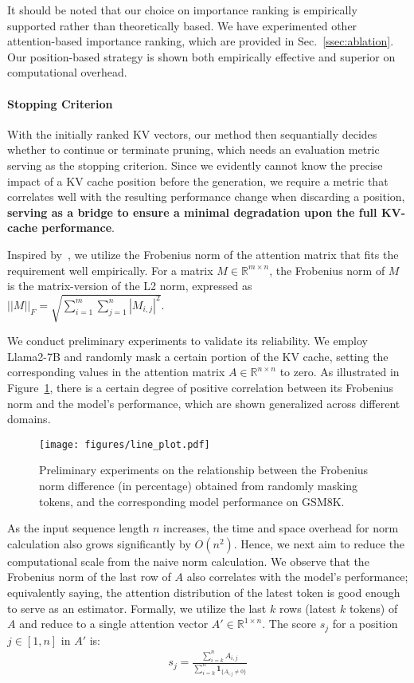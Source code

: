 It should be noted that our choice on importance ranking is empirically supported rather than theoretically based. We have experimented other attention-based importance ranking, which are provided in Sec.~\ref{ssec:ablation}. Our position-based strategy is shown both empirically effective and superior on computational overhead.

\paragraph{Stopping Criterion}
With the initially ranked KV vectors, our method then sequantially decides whether to continue or terminate pruning, which needs an evaluation metric serving as the stopping criterion.
Since we evidently cannot know the precise impact of a KV cache position before the generation, we require a metric that correlates well with the resulting performance change when discarding a position, \textbf{serving as a bridge to ensure a minimal degradation upon the full KV-cache performance}.

Inspired by~\citet{DBLP:journals/corr/abs-2406-11430}, we utilize the Frobenius norm of the attention matrix that fits the requirement well empirically. 
For a matrix $M \in \mathbb{R}^{m\times n}$, the Frobenius norm of $M$ is the matrix-version of the L2 norm, expressed as $||M||_F = \sqrt{\sum_{i=1}^m\sum_{j=1}^n|M_{i,j}|^2}$.

We conduct preliminary experiments to validate its reliability. We employ Llama2-7B and randomly mask a certain portion of the KV cache, setting the corresponding values in the attention matrix $A\in \mathbb{R}^{n\times n}$ to zero.
As illustrated in Figure~\ref{correlation}, there is a certain degree of positive correlation between its Frobenius norm and the model's performance, which are shown generalized across different domains.

\begin{figure}[!t]
   \centering
   \texttt{[image: figures/line\_plot.pdf]}
        \caption{Preliminary experiments on the relationship between the Frobenius norm difference (in percentage) obtained from randomly masking tokens, and the corresponding model performance on GSM8K.}
    \label{correlation}
\end{figure}

As the input sequence length $n$ increases, the time and space overhead for norm calculation also grows significantly by $O(n^2)$. Hence, we next aim to reduce the computational scale from the naive norm calculation. We observe that the Frobenius norm of the last row of $A$ also correlates with the model's performance; equivalently saying, the attention distribution of the latest token is good enough to serve as an estimator.
Formally, we utilize the last $k$ rows (latest $k$ tokens) of $A$ and reduce to a single attention vector $A'\in\mathbb{R}^{1\times n}$. The score $s_j$ for a position $j \in [1,n]$ in $A'$ is:
\begin{align}
 s_j = \frac{\sum_{i=k}^{n}A_{i,j}}{\sum_{i=k}^n\mathbf{1}_{\{A_{i,j}\neq 0\}}}
\end{align}

